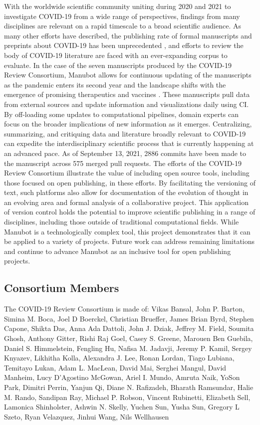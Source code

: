 \documentclass[twocolumn]{ceurart}
\begin{document}
With the worldwide scientific community uniting during 2020 and 2021 to investigate COVID-19 from a wide range of perspectives, findings from many disciplines are relevant on a rapid timescale to a broad scientific audience.
As many other efforts have described, the publishing rate of formal manuscripts and preprints about COVID-19 has been unprecedented \citep{7ub6VM4Z}, and efforts to review the body of COVID-19 literature are faced with an ever-expanding corpus to evaluate.
In the case of the seven manuscripts produced by the COVID-19 Review Consortium, Manubot allows for continuous updating of the manuscripts as the pandemic enters its second year and the landscape shifts with the emergence of promising therapeutics and vaccines \citep{njpLhBui}.
These manuscripts pull data from external sources and update information and visualizations daily using CI.
By off-loading some updates to computational pipelines, domain experts can focus on the broader implications of new information as it emerges.
Centralizing, summarizing, and critiquing data and literature broadly relevant to COVID-19 can expedite the interdisciplinary scientific process that is currently happening at an advanced pace.
As of September 13, 2021, 2886 commits have been made to the manuscript across 575 merged pull requests.
The efforts of the COVID-19 Review Consortium illustrate the value of including open source tools, including those focused on open publishing, in these efforts.
By facilitating the versioning of text, such platforms also allow for documentation of the evolution of thought in an evolving area and formal analysis of a collaborative project.
This application of version control holds the potential to improve scientific publishing in a range of disciplines, including those outside of traditional computational fields.
While Manubot is a technologically complex tool, this project demonstrates that it can be applied to a variety of projects.
Future work can address remaining limitations and continue to advance Manubot as an inclusive tool for open publishing projects.

\hypertarget{consortium-members}{%
\subsection*{Consortium Members}\label{consortium-members}}

The COVID-19 Review Consortium is made of:
Vikas Bansal, John P. Barton, Simina M. Boca, Joel D Boerckel, Christian Brueffer, James Brian Byrd, Stephen Capone, Shikta Das, Anna Ada Dattoli, John J. Dziak, Jeffrey M. Field, Soumita Ghosh, Anthony Gitter, Rishi Raj Goel, Casey S. Greene, Marouen Ben Guebila, Daniel S. Himmelstein, Fengling Hu, Nafisa M. Jadavji, Jeremy P. Kamil, Sergey Knyazev, Likhitha Kolla, Alexandra J. Lee, Ronan Lordan, Tiago Lubiana, Temitayo Lukan, Adam L. MacLean, David Mai, Serghei Mangul, David Manheim, Lucy D'Agostino McGowan, Ariel I. Mundo, Amruta Naik, YoSon Park, Dimitri Perrin, Yanjun Qi, Diane N. Rafizadeh, Bharath Ramsundar, Halie M. Rando, Sandipan Ray, Michael P. Robson, Vincent Rubinetti, Elizabeth Sell, Lamonica Shinholster, Ashwin N. Skelly, Yuchen Sun, Yusha Sun, Gregory L Szeto, Ryan Velazquez, Jinhui Wang, Nils Wellhausen
\end{document}
